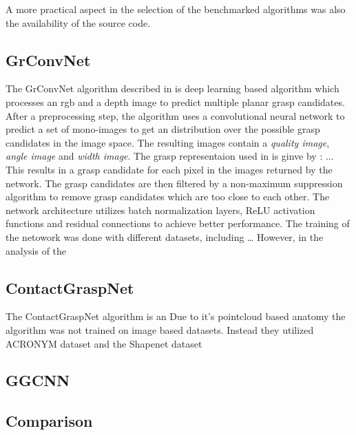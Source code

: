 A more practical aspect in the selection of the benchmarked algorithms was also the availability of the source code.

\subsection{GrConvNet}
The GrConvNet algorithm described in \cite{} is deep learning based algorithm which processes an rgb and a depth image to predict multiple planar grasp candidates.
After a preprocessing step, the algorithm uses a convolutional neural network to predict a set of mono-images to get an distribution over the possible grasp candidates in the image space.
The resulting images contain a \textit{quality image}, \textit{angle image} and \textit{width image}.
The grasp representaion used in \cite{} is ginve by : ...
This results in a grasp candidate for each pixel in the images returned by the network.
The grasp candidates are then filtered by a non-maximum suppression algorithm to remove grasp candidates which are too close to each other.
The network architecture utilizes batch normalization layers, ReLU activation functions and residual connections to achieve better performance.
The training of the netowork was done with different datasets, including \dots
However, in the analysis of the
\subsection{ContactGraspNet}
The ContactGraspNet algorithm is an
Due to it's pointcloud based anatomy the algorithm was not trained on image based datasets.
Instead they utilized ACRONYM dataset and the Shapenet dataset
\subsection{GGCNN}
\subsection{Comparison}
